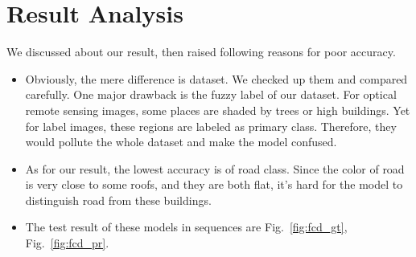 \documentclass[]{IEEEtran}
\begin{document}
\section{Result Analysis}
	We discussed about our result, then raised following reasons for poor accuracy.
	\begin{itemize}
		\item Obviously, the mere difference is dataset. We checked up them and compared carefully. One major drawback is the fuzzy label of our dataset. For optical remote sensing images, some places are shaded by trees or high buildings. Yet for label images, these regions are labeled as primary class. Therefore, they would pollute the whole dataset and make the model confused.   
		\item As for our result, the lowest accuracy is of road class. Since the color of road is very close to some roofs, and they are both flat, it's hard for the model to distinguish road from these buildings.  
		\item The test result of these models in sequences are Fig.~\ref{fig:fcd_gt},  Fig.~\ref{fig:fcd_pr}.
	\end{itemize}
\newpage
\end{document}
